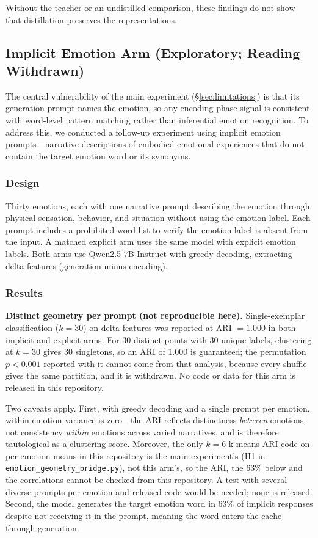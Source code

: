 \documentclass[11pt,a4paper]{article}
\begin{document}
Without the teacher or an undistilled comparison, these findings do not show that distillation preserves the representations.

\subsection{Implicit Emotion Arm (Exploratory; Reading Withdrawn)}
\label{sec:implicit}

The central vulnerability of the main experiment (\S\ref{sec:limitations}) is
that its generation prompt names the emotion, so any encoding-phase
signal is consistent with word-level pattern matching rather than inferential
emotion recognition. To address this, we conducted a follow-up
experiment using implicit emotion prompts---narrative descriptions of
embodied emotional experiences that do not contain the target emotion
word or its synonyms.

\subsubsection{Design}

Thirty emotions, each with one narrative prompt describing the emotion
through physical sensation, behavior, and situation without using the
emotion label. Each prompt includes a prohibited-word list to verify
the emotion label is absent from the input. A matched explicit arm
uses the same model with explicit emotion labels. Both arms use
Qwen2.5-7B-Instruct with greedy decoding, extracting delta features
(generation minus encoding).

\subsubsection{Results}

\textbf{Distinct geometry per prompt (not reproducible here).} Single-exemplar
classification ($k=30$) on delta features was reported at ARI $= 1.000$ in both
implicit and explicit arms. For 30 distinct points with 30 unique labels,
clustering at $k = 30$ gives 30 singletons, so an ARI of 1.000 is guaranteed;
the permutation $p < 0.001$ reported with it cannot come from that analysis,
because every shuffle gives the same partition, and it is withdrawn. No code
or data for this arm is released in this repository.

Two caveats apply. First, with greedy decoding and a single prompt per
emotion, within-emotion variance is zero---the ARI reflects
distinctness \emph{between} emotions, not consistency \emph{within}
emotions across varied narratives, and is therefore tautological
as a clustering score. Moreover, the only $k=6$ k-means ARI code on
per-emotion means in this repository is the main experiment's (H1 in
\texttt{emotion\_geometry\_bridge.py}), not this arm's, so the ARI, the
63\% below and the correlations cannot be checked from this repository.
A test with several diverse prompts per emotion and released code would
be needed; none is released. Second, the model generates the
target emotion word in 63\% of implicit responses despite not receiving
it in the prompt, meaning the word enters the cache through generation.
\end{document}
